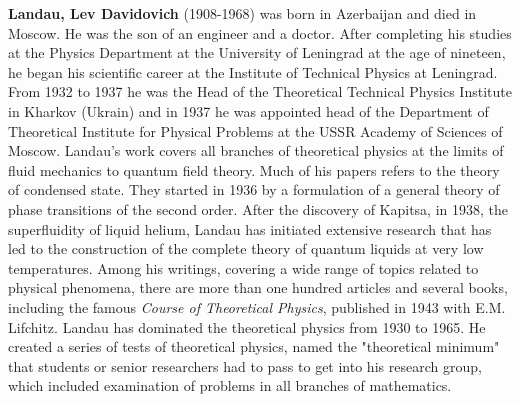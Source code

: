 \textbf{Landau, Lev Davidovich} (1908-1968) was born in Azerbaijan and died in Moscow. He was the son of an engineer and a doctor. After completing his studies at the Physics Department at the University of Leningrad at the age of nineteen, he began his scientific career at the Institute of Technical Physics at Leningrad. From 1932 to 1937 he was the Head of the Theoretical Technical Physics  Institute in Kharkov (Ukrain) and in 1937 he was appointed head of the Department of Theoretical Institute for Physical Problems at the USSR Academy of Sciences of Moscow. Landau's work covers all branches of theoretical physics at the limits of fluid mechanics to quantum field theory. Much of his papers refers to the theory of condensed state. They started in 1936 by a formulation of a general theory of phase transitions of the second order. After the discovery of Kapitsa, in 1938, the superfluidity of liquid helium, Landau has initiated extensive research that has led to the construction of the complete theory of quantum liquids at very low temperatures. Among his writings, covering a wide range of topics related to physical phenomena, there are more than one hundred articles and several books, including the famous \textit{Course of Theoretical Physics}, published in 1943 with E.M. Lifchitz. Landau has dominated the theoretical physics from 1930 to 1965. He created a series of tests of theoretical physics, named the "theoretical minimum" that students or senior researchers had to pass to get into his research group, which included examination of problems in all branches of mathematics.


